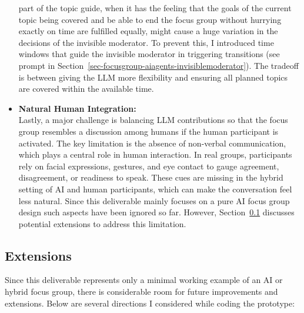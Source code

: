 \documentclass[
  letterpaper,
  DIV=11,
  numbers=noendperiod]{scrartcl}
\begin{document}
\begin{itemize}
  part of the topic guide, when it has the feeling that the goals of the
  current topic being covered and be able to end the focus group without
  hurrying exactly on time are fulfilled equally, might cause a huge
  variation in the decisions of the invisible moderator. To prevent
  this, I introduced time windows that guide the invisible moderator in
  triggering transitions (see prompt in
  Section~\ref{sec-focusgroup-aiagents-invisiblemoderator}). The
  tradeoff is between giving the LLM more flexibility and ensuring all
  planned topics are covered within the available time.
\item
  \textbf{Natural Human Integration:}\\
  Lastly, a major challenge is balancing LLM contributions so that the
  focus group resembles a discussion among humans if the human
  participant is activated. The key limitation is the absence of
  non-verbal communication, which plays a central role in human
  interaction. In real groups, participants rely on facial expressions,
  gestures, and eye contact to gauge agreement, disagreement, or
  readiness to speak. These cues are missing in the hybrid setting of AI
  and human participants, which can make the conversation feel less
  natural. Since this deliverable mainly focuses on a pure AI focus
  group design such aspects have been ignored so far. However,
  Section~\ref{sec-focusgroup-extensions} discusses potential extensions
  to address this limitation.
\end{itemize}

\subsection{Extensions}\label{sec-focusgroup-extensions}

Since this deliverable represents only a minimal working example of an
AI or hybrid focus group, there is considerable room for future
improvements and extensions. Below are several directions I considered
while coding the prototype:
\end{document}
